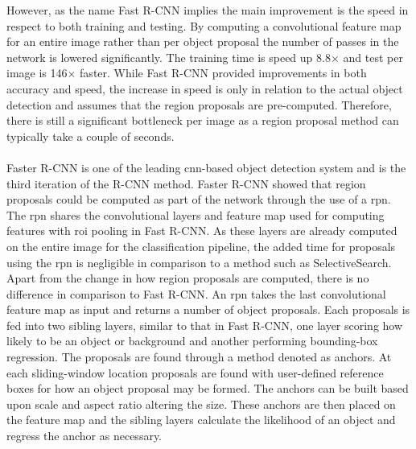 \documentclass[a4paper,twoside]{article}
\begin{document}
However, as the name Fast R-CNN implies the main improvement is the speed in respect to both training and testing. By computing a convolutional feature map for an entire image rather than per object proposal the number of passes in the network is lowered significantly. The training time is speed up 8.8$\times$ and test per image is 146$\times$ faster. While Fast R-CNN provided improvements in both accuracy and speed, the increase in speed is only in relation to the actual object detection and assumes that the region proposals are pre-computed. Therefore, there is still a significant bottleneck per image as a region proposal method can typically take a couple of seconds. 
\\\\
Faster R-CNN \cite{fasterrcnn} is one of the leading \gls{cnn}-based object detection system and is the third iteration of the R-CNN method. Faster R-CNN showed that region proposals could be computed as part of the network through the use of a \gls{rpn}. The \gls{rpn} shares the convolutional layers and feature map used for computing features with \gls{roi} pooling in Fast R-CNN. As these layers are already computed on the entire image for the classification pipeline, the added time for proposals using the \gls{rpn} is negligible in comparison to a method such as SelectiveSearch. Apart from the change in how region proposals are computed, there is no difference in comparison to Fast R-CNN. 
An \gls{rpn} takes the last convolutional feature map as input and returns a number of object proposals. Each proposals is fed into two sibling layers, similar to that in Fast R-CNN, one layer scoring how likely to be an object or background and another performing bounding-box regression. The proposals are found through a method denoted as anchors. At each sliding-window location proposals are found with user-defined reference boxes for how an object proposal may be formed. The anchors can be built based upon scale and aspect ratio altering the size. These anchors are then placed on the feature map and the sibling layers calculate the likelihood of an object and regress the anchor as necessary.  
\end{document}
